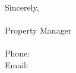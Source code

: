 
\vspace{1cm}
Sincerely,\\
\ManagerName\\
Property Manager\\
\Company\\
Phone: \ManagerPhone\\
Email: \ManagerEmail
